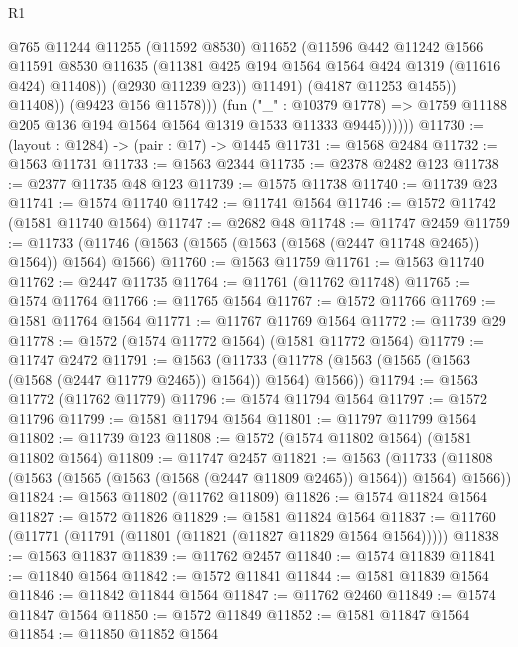 \begin{lexlean}{R1}
\begin{coremodule}
                            @765
                            @11244
                            @11255
                            (@11592 @8530)
                            @11652
                            (@11596
                              @442
                              @11242
                              @1566
                              @11591
                              @8530
                              @11635
                              (@11381 @425 @194 @1564 @1564 @424 @1319 (@11616 @424) @11408))
                            (@2930 @11239 @23))
                          @11491)
                        (@4187 @11253 @1455))
                      @11408))
                  (@9423 @156 @11578)))
              (fun ("_" : @10379 @1778) =>
              @1759 @11188 @205 @136 @194 @1564 @1564 @1319 @1533 @11333 @9445))))))
@11730 := (layout : @1284) -> (pair : @17) -> @1445
@11731 := @1568 @2484
@11732 := @1563 @11731
@11733 := @1563 @2344
@11735 := @2378 @2482 @123
@11738 := @2377 @11735 @48 @123
@11739 := @1575 @11738
@11740 := @11739 @23
@11741 := @1574 @11740
@11742 := @11741 @1564
@11746 := @1572 @11742 (@1581 @11740 @1564)
@11747 := @2682 @48
@11748 := @11747 @2459
@11759 := @11733 (@11746 (@1563 (@1565 (@1563 (@1568 (@2447 @11748 @2465)) @1564)) @1564) @1566)
@11760 := @1563 @11759
@11761 := @1563 @11740
@11762 := @2447 @11735
@11764 := @11761 (@11762 @11748)
@11765 := @1574 @11764
@11766 := @11765 @1564
@11767 := @1572 @11766
@11769 := @1581 @11764 @1564
@11771 := @11767 @11769 @1564
@11772 := @11739 @29
@11778 := @1572 (@1574 @11772 @1564) (@1581 @11772 @1564)
@11779 := @11747 @2472
@11791 := @1563
    (@11733 (@11778 (@1563 (@1565 (@1563 (@1568 (@2447 @11779 @2465)) @1564)) @1564) @1566))
@11794 := @1563 @11772 (@11762 @11779)
@11796 := @1574 @11794 @1564
@11797 := @1572 @11796
@11799 := @1581 @11794 @1564
@11801 := @11797 @11799 @1564
@11802 := @11739 @123
@11808 := @1572 (@1574 @11802 @1564) (@1581 @11802 @1564)
@11809 := @11747 @2457
@11821 := @1563
    (@11733 (@11808 (@1563 (@1565 (@1563 (@1568 (@2447 @11809 @2465)) @1564)) @1564) @1566))
@11824 := @1563 @11802 (@11762 @11809)
@11826 := @1574 @11824 @1564
@11827 := @1572 @11826
@11829 := @1581 @11824 @1564
@11837 := @11760 (@11771 (@11791 (@11801 (@11821 (@11827 @11829 @1564 @1564)))))
@11838 := @1563 @11837
@11839 := @11762 @2457
@11840 := @1574 @11839
@11841 := @11840 @1564
@11842 := @1572 @11841
@11844 := @1581 @11839 @1564
@11846 := @11842 @11844 @1564
@11847 := @11762 @2460
@11849 := @1574 @11847 @1564
@11850 := @1572 @11849
@11852 := @1581 @11847 @1564
@11854 := @11850 @11852 @1564

\end{coremodule}
\end{lexlean}
